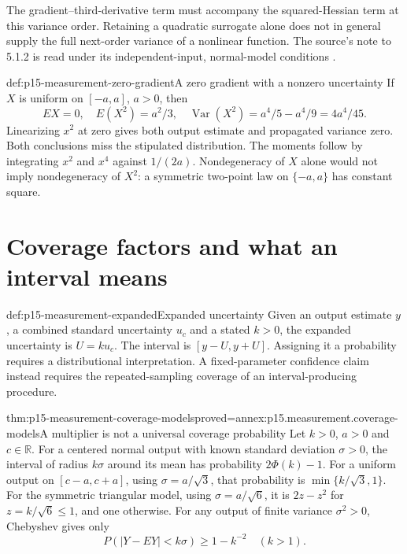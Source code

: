The gradient--third-derivative term must accompany the squared-Hessian
term at this variance order. Retaining a quadratic surrogate alone does not
in general supply the full next-order variance of a nonlinear function.
The source's note to 5.1.2 is read under its independent-input, normal-model
conditions \cite[5.1.2]{JCGM1002008EMeasurement}.

\begin{hbexample}{def:p15-measurement-zero-gradient}{A zero gradient with a nonzero uncertainty}
If \(X\) is uniform on \([-a,a]\), \(a>0\), then
\[
 EX=0,\quad E(X^2)=a^2/3,\quad
 \operatorname{Var}(X^2)=a^4/5-a^4/9=4a^4/45.
\]
Linearizing \(x^2\) at zero gives both output estimate and propagated
variance zero. Both conclusions miss the stipulated distribution.
The moments follow by integrating \(x^2\) and \(x^4\) against \(1/(2a)\).
Nondegeneracy of \(X\) alone would not imply nondegeneracy of \(X^2\):
a symmetric two-point law on \(\{-a,a\}\) has constant square.
\end{hbexample}

\section{Coverage factors and what an interval means}
\label{sec:p15-measurement-coverage}

\begin{hbdefinition}{def:p15-measurement-expanded}{Expanded uncertainty}
Given an output estimate \(y\), a combined standard uncertainty \(u_c\)
and a stated \(k>0\), the expanded uncertainty is \(U=ku_c\).
The interval is \([y-U,y+U]\). Assigning it a probability requires a
distributional interpretation. A fixed-parameter confidence claim instead
requires the repeated-sampling coverage of an interval-producing procedure.
\end{hbdefinition}

\begin{hbtheorem}{thm:p15-measurement-coverage-models}{proved=annex:p15.measurement.coverage-models}{A multiplier is not a universal coverage probability}
Let \(k>0\), \(a>0\) and \(c\in\mathbb R\).
For a centered normal output with known standard deviation \(\sigma>0\),
the interval of radius \(k\sigma\) around its mean has probability
\(2\Phi(k)-1\). For a uniform output on \([c-a,c+a]\), using
\(\sigma=a/\sqrt3\), that probability is
\(\min\{k/\sqrt3,1\}\).
For the symmetric triangular model, using \(\sigma=a/\sqrt6\), it is
\(2z-z^2\) for \(z=k/\sqrt6\leq1\), and one otherwise.
For any output of finite variance \(\sigma^2>0\), Chebyshev gives only
\[
 P(|Y-EY|<k\sigma)\geq1-k^{-2}\quad(k>1).
\]
\end{hbtheorem}

